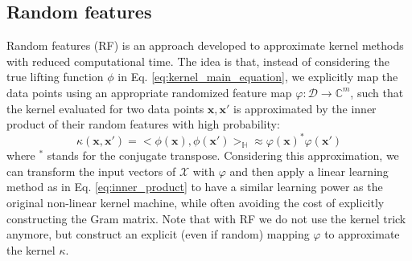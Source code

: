\subsection{Random features}
\label{sec:RF}
Random features (RF) \citep{rahimi2008random} is an approach developed to approximate kernel methods with reduced computational time. The idea is that, instead of considering the true lifting function $\phi$ in Eq. \ref{eq:kernel_main_equation}, we explicitly map the data points using an appropriate randomized feature map $\varphi:\mathcal{D} \xrightarrow{}\mathbb{C}^m$, such that the kernel evaluated for two data points $\mathbf{x}, \mathbf{x}'$ is approximated by the inner product of their random features with high probability:
\begin{equation}
\label{eq:approx_RF}
\kappa(\mathbf{x},\mathbf{x}')=<\phi(\mathbf{x}),\phi(\mathbf{x}')>_\mathbb{H} \approx \varphi(\mathbf{x})^*\varphi(\mathbf{x}')
\end{equation}
where $^*$ stands for the conjugate transpose. 
Considering this approximation, we can transform the input vectors of $\mathcal{X}$ with $\varphi$ and then apply a linear learning method as in Eq. \ref{eq:inner_product} to have a similar learning power as the original non-linear kernel machine, while often avoiding the cost of explicitly constructing the Gram matrix. Note that with RF we do not use the kernel trick anymore, but construct an explicit (even if random) mapping $\varphi$ to approximate the kernel $\kappa$.

